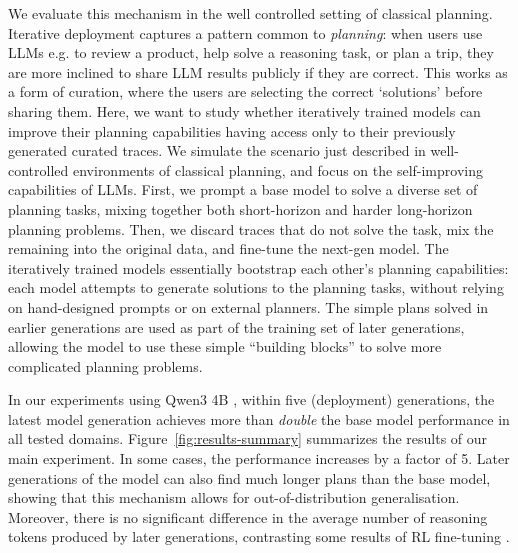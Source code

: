\documentclass{article}
\renewcommand{\cite}[1]{\citep[][]{#1}}
\begin{document}
We evaluate this mechanism in the well controlled setting of classical planning.
Iterative deployment captures a pattern common to \emph{planning}: when users use LLMs e.g. to review a product, help solve a reasoning task, or plan a trip, they are more inclined to share LLM results publicly if they are correct. This works as a form of curation, where the users are selecting the correct `solutions' before sharing them. Here, we want to study whether iteratively trained models can improve their planning capabilities having access only to their previously generated curated traces. We simulate the scenario just described in well-controlled environments of classical planning, and focus on the self-improving capabilities of LLMs.
First, we prompt a base
model to solve a diverse set of planning tasks, mixing together both
short-horizon and harder long-horizon planning problems. Then, we discard traces that do not solve the task, mix the remaining into the original data, and fine-tune the next-gen
model. The iteratively trained models essentially
bootstrap each other's planning capabilities: each model attempts to generate solutions to the planning tasks,
without relying on hand-designed prompts or on external planners.  The simple
plans solved in earlier generations are used as part of the training set of
later generations, allowing the model to use these simple ``building blocks'' to
solve more complicated planning problems.

In our experiments using Qwen3 4B \citep{qwen3-tr}, within five (deployment) generations, the
latest model generation achieves more than \emph{double} the base model
performance in all tested domains. Figure~\ref{fig:results-summary} summarizes
the results of our main experiment. In some cases, the performance increases by
a factor of 5. Later generations of the model can also find much longer plans
than the base model, showing that this mechanism allows for out-of-distribution
generalisation. Moreover, there is no significant difference in the average
number of reasoning tokens produced by later generations, contrasting some
results of RL fine-tuning \cite{deepseek-arxiv2025}.
\end{document}
